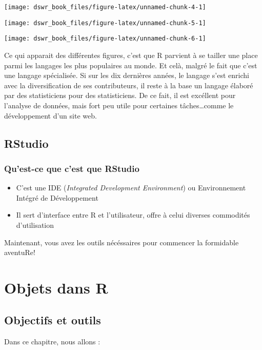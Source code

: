 \documentclass[]{book}
\begin{document}
\texttt{[image: dswr\_book\_files/figure-latex/unnamed-chunk-4-1]}

\texttt{[image: dswr\_book\_files/figure-latex/unnamed-chunk-5-1]}

\texttt{[image: dswr\_book\_files/figure-latex/unnamed-chunk-6-1]}

Ce qui apparait des différentes figures, c'est que R parvient à se
tailler une place parmi les langages les plus populaires au monde. Et
celà, malgré le fait que c'est une langage spécialisée. Si sur les dix
dernières années, le langage s'est enrichi avec la diversification de
ses contributeurs, il reste à la base un langage élaboré par des
statisticiens pour des statisticiens. De ce fait, il est excéllent pour
l'analyse de données, mais fort peu utile pour certaines
tâches\ldots{}comme le développement d'un site web.

\section{RStudio}\label{rstudio}

\subsection{Qu'est-ce que c'est que
RStudio}\label{quest-ce-que-cest-que-rstudio}

\begin{itemize}
\item
  C'est une IDE (\emph{Integrated Development Environment}) ou
  Environnement Intégré de Développement
\item
  Il sert d'interface entre R et l'utilisateur, offre à celui diverses
  commodités d'utilisation
\end{itemize}

Maintenant, vous avez les outils nécéssaires pour commencer la
formidable aventuRe!

\chapter{Objets dans R}\label{objets-dans-r}

\section{Objectifs et outils}\label{objectifs-et-outils}

Dans ce chapitre, nous allons :
\end{document}
